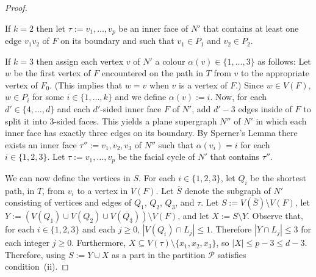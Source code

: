 \documentclass{patmorin}
\theoremstyle{plain}
\theoremstyle{definition}
\newcommand{\PP}{\mathcal{P}}
\renewcommand{\ge}{\geqslant}
\renewcommand{\le}{\leqslant}
\begin{document}
\begin{proof}
\begin{compactenum}
		\item If $k= 2$ then let $\tau:=v_1,\ldots,v_p$ be an inner face of $N'$ that contains at least one edge $v_1v_2$ of $F$ on its boundary and such that $v_1\in P_1$ and $v_2\in P_2$.

		\item If $k=3$ then assign each vertex $v$ of $N'$ a colour $\alpha(v)\in\{1,\ldots,3\}$ as follows:  Let $w$ be the first vertex of $F$ encountered on the path in $T$ from $v$ to the appropriate vertex of $F_0$.  (This implies that $w=v$ when $v$ is a vertex of $F$.)  Since $w\in V(F)$, $w\in P_i$ for some $i\in\{1,\ldots,k\}$ and we define $\alpha(v):=i$.  Now, for each $d'\in\{4,\ldots,d\}$ and each $d'$-sided inner face $F$ of $N'$, add $d'-3$ edges inside of $F$ to split it into $3$-sided faces.  This yields a plane supergraph $N''$ of $N'$ in which each inner face has exactly three edges on its boundary. By Sperner's Lemma there exists an inner face $\tau'':=v_1,v_2,v_3$ of $N''$ such that $\alpha(v_i)=i$ for each $i\in\{1,2,3\}$.  Let $\tau:=v_1,\ldots,v_p$ be  the facial cycle of $N'$ that contains $\tau''$.
	\end{compactenum}


	We can now define the vertices in $S$.  For each $i\in\{1,2,3\}$, let $Q_i$ be the shortest path, in $T$, from $v_i$ to a vertex in $V(F)$.  Let $\overline{S}$ denote the subgraph of $N'$ consisting of vertices and edges of $Q_1$, $Q_2$, $Q_3$, and $\tau$.
	Let $S:=V(\overline{S})\setminus V(F)$, let $Y:=(V(Q_1)\cup V(Q_2)\cup V(Q_3))\setminus V(F)$, and let $X:=S\setminus Y$. Observe that, for each $i\in\{1,2,3\}$ and each $j\ge 0$, $|V(Q_i)\cap L_j|\le 1$.  Therefore $|Y\cap L_j|\le 3$ for each integer $j\ge 0$. Furthermore, $X\subseteq V(\tau)\setminus\{x_1,x_2,x_3\}$, so $|X|\le p-3\le d-3$. Therefore, using $S:=Y\cup X$ as a part in the partition $\PP$ satisfies condition~(ii).


\end{proof}
\end{document}
